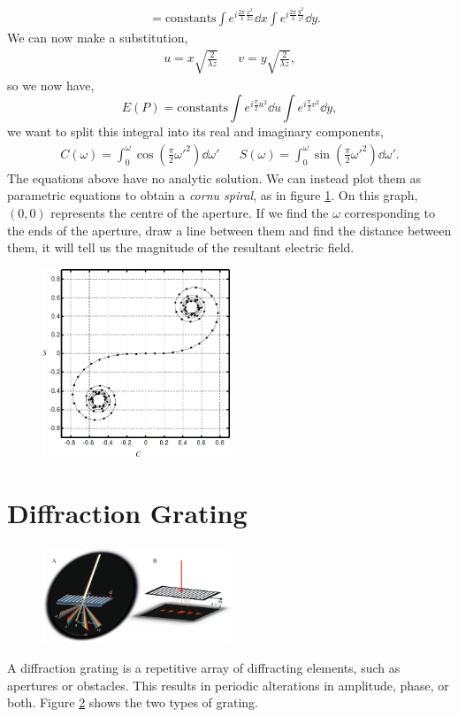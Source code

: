 \documentclass{book}
\begin{document}
{\begin{equation}
\begin{split}
	& = \text{constants}\int e^{i\frac{2\pi}{\lambda}\frac{x^2}{2z}}\dd{x}\int e^{i\frac{2\pi}{\lambda}\frac{y^2}{z^2}}\dd{y}.
	\end{split}
\end{equation}
We can now make a substitution,
\begin{align}
	u = x\sqrt{\frac{2}{\lambda z}} && v = y\sqrt{\frac{2}{\lambda z}},
\end{align}
so we now have,
\begin{equation}
	E(P) = \text{constants}\int e^{i\frac{\pi}{2}u^2}\dd{u} \int e^{i\frac{\pi}{2}v^2}\dd{y},
\end{equation}
we want to split this integral into its real and imaginary components,
\begin{align}
	C(\omega) = \int_0^{\omega}\cos\left(\frac{\pi}{2}\omega'^2\right)\dd{\omega'} && S(\omega) = \int_0^{\omega}\sin\left(\frac{\pi}{2}\omega'^2\right)\dd{\omega'}.
\end{align}
The equations above have no analytic solution. We can instead plot them as parametric equations to obtain a \textit{cornu spiral}, as in figure \ref{fig:cornuspiral}. On this graph, $(0,0)$ represents the centre of the aperture. If we find the $\omega$ corresponding to the ends of the aperture, draw a line between them and find the distance between them, it will tell us the magnitude of the resultant electric field.
\begin{figure}
	\centering
	\includegraphics[width=0.5\textwidth]{cornu.PNG}
	\caption{}
	\label{fig:cornuspiral}
\end{figure}
\section{Diffraction Grating}
\begin{figure}[h]
	\centering
	\includegraphics[width=0.5\textwidth]{diff.png}
	\caption{}
	\label{fig:diff}
\end{figure}
A diffraction grating is a repetitive array of diffracting elements, such as apertures or obstacles. This results in periodic alterations in amplitude, phase, or both. Figure \ref{fig:diff} shows the two types of grating.
}
\end{document}
